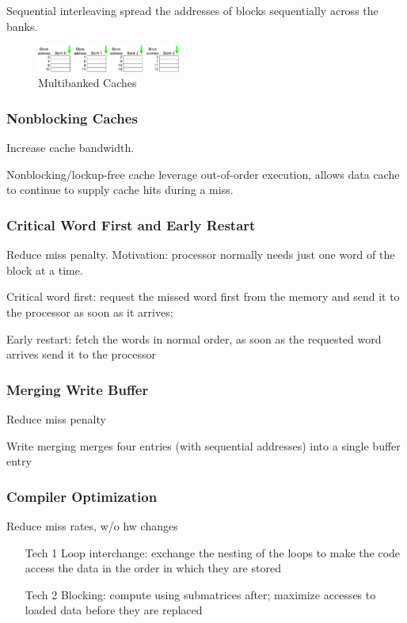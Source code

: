 Sequential interleaving  spread the addresses of blocks sequentially across the banks. 
 
\begin{figure}[!htb]
    \centering
    \includegraphics[width=0.42\textwidth]{pic/CA2/Multibanked Caches}
    \caption{Multibanked Caches}
\end{figure}

\subsubsection{Nonblocking Caches}
Increase cache bandwidth. 

Nonblocking/lockup-free cache leverage out-of-order execution, allows data cache to continue to supply cache hits during a miss. 

\subsubsection{Critical Word First and Early Restart}
Reduce miss penalty. Motivation: processor normally needs just one word of the block at a time. 

Critical word first: request the missed word first from the memory and send it to the processor as soon as it arrives;

Early restart: fetch the words in normal order, as soon as the requested word arrives send it to the processor

\subsubsection{Merging Write Buffer}
Reduce miss penalty

Write merging merges four entries (with sequential addresses) into a single buffer entry

\subsubsection{Compiler Optimization}
Reduce miss rates, w/o hw changes

\begin{enumerate}
    \item [Tech 1] Loop interchange: exchange the nesting of the loops to make the code access the data in the order in which they are stored
    \item [Tech 2] Blocking: compute using submatrices after; maximize accesses to loaded data before they are replaced
\end{enumerate}

